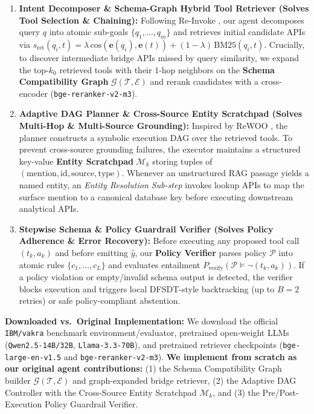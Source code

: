 \documentclass[10pt]{article}
\begin{document}
\begin{enumerate}
    \item \textbf{Intent Decomposer \& Schema-Graph Hybrid Tool Retriever (Solves Tool Selection \& Chaining):} Following Re-Invoke \cite{chen2024reinvoke}, our agent decomposes query $q$ into atomic sub-goals $\{q_1, \dots, q_m\}$ and retrieves initial candidate APIs via $s_{\text{ret}}(q_i, t) = \lambda\,\text{cos}(\mathbf{e}(q_i), \mathbf{e}(t)) + (1-\lambda)\,\text{BM25}(q_i, t)$. Crucially, to discover intermediate bridge APIs missed by query similarity, we expand the top-$k_0$ retrieved tools with their $1$-hop neighbors on the \textbf{Schema Compatibility Graph} $\mathcal{G}(\mathcal{T}, \mathcal{E})$ and rerank candidates with a cross-encoder (\texttt{bge-reranker-v2-m3}).
    \item \textbf{Adaptive DAG Planner \& Cross-Source Entity Scratchpad (Solves Multi-Hop \& Multi-Source Grounding):} Inspired by ReWOO \cite{xu2023rewoo}, the planner constructs a symbolic execution DAG over the retrieved tools. To prevent cross-source grounding failures, the executor maintains a structured key-value \textbf{Entity Scratchpad} $\mathcal{M}_k$ storing tuples of $(\text{mention}, \text{id}, \text{source}, \text{type})$. Whenever an unstructured RAG passage yields a named entity, an \textit{Entity Resolution Sub-step} invokes lookup APIs to map the surface mention to a canonical database key before executing downstream analytical APIs.
    \item \textbf{Stepwise Schema \& Policy Guardrail Verifier (Solves Policy Adherence \& Error Recovery):} Before executing any proposed tool call $(t_k, a_k)$ and before emitting $\hat{y}$, our \textbf{Policy Verifier} parses policy $\mathcal{P}$ into atomic rules $\{c_1, \dots, c_L\}$ and evaluates entailment $P_{\text{verify}}(\mathcal{P} \models \neg(t_k, a_k))$. If a policy violation or empty/invalid schema output is detected, the verifier blocks execution and triggers local DFSDT-style backtracking (up to $B=2$ retries) or safe policy-compliant abstention.
\end{enumerate}
\textbf{Downloaded vs.\ Original Implementation:} We download the official \texttt{IBM/vakra} benchmark environment/evaluator, pretrained open-weight LLMs (\texttt{Qwen2.5-14B/32B}, \texttt{Llama-3.3-70B}), and pretrained retriever checkpoints (\texttt{bge-large-en-v1.5} and \texttt{bge-reranker-v2-m3}). \textbf{We implement from scratch as our original agent contributions:} (1) the Schema Compatibility Graph builder $\mathcal{G}(\mathcal{T}, \mathcal{E})$ and graph-expanded bridge retriever, (2) the Adaptive DAG Controller with the Cross-Source Entity Scratchpad $\mathcal{M}_k$, and (3) the Pre/Post-Execution Policy Guardrail Verifier.
\end{document}
